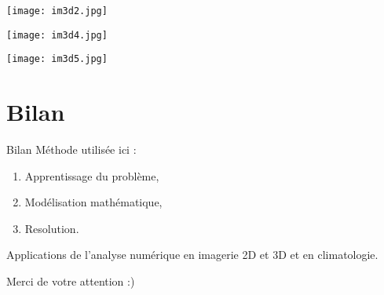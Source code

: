 \documentclass[11pt]{beamer}
\begin{document}
\begin{frame}
\begin{center}
\texttt{[image: im3d2.jpg]}
\end{center}
\end{frame}

\begin{frame}
\begin{center}
\texttt{[image: im3d4.jpg]}
\end{center}
\end{frame}

\begin{frame}
\begin{center}
\texttt{[image: im3d5.jpg]}
\end{center}
\end{frame}

\section{Bilan}
\begin{frame}{Bilan}
Méthode utilisée ici :
\begin{enumerate}
\item Apprentissage du problème,
\item Modélisation mathématique,
\item Resolution.
\end{enumerate}

Applications de l'analyse numérique en imagerie 2D et 3D et en climatologie.

\end{frame}

\begin{frame}
\begin{center}
Merci de votre attention :)
\end{center}
\end{frame}
\end{document}
